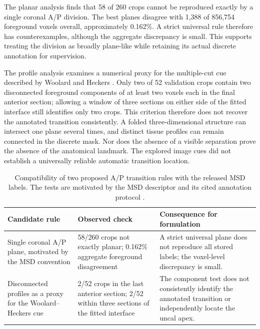 \documentclass[12pt,a4paper]{article}
\begin{document}
The planar analysis finds that 58 of 260 crops cannot be reproduced
exactly by a single coronal A/P division. The best planes disagree
with 1,388 of 856,754 foreground voxels overall, approximately
0.162\%. A strict universal rule therefore has counterexamples,
although the aggregate discrepancy is small. This supports treating
the division as broadly plane-like while retaining its actual discrete
annotation for supervision.

The profile analysis examines a numerical proxy for the multiple-cut
cue described by Woolard and Heckers \cite{woolard2012asymmetry}.
Only two of 52 validation crops contain two disconnected foreground
components of at least two voxels each in the final anterior section;
allowing a window of three sections on either side of the fitted
interface still identifies only two crops. This criterion therefore
does not recover the annotated transition consistently. A folded
three-dimensional structure can intersect one plane several times,
and distinct tissue profiles can remain connected in the discrete mask.
Nor does the absence of a visible separation prove the absence of the
anatomical landmark. The explored image cues did not establish a
universally reliable automatic transition location.

\begin{table}[htbp]
\centering\small{}
\begin{tabular}{@{}P{3.6cm}P{4.2cm}P{6.8cm}@{}}
\hline
Candidate rule & Observed check & Consequence for formulation \\
\hline
Single coronal A/P plane, motivated by the MSD convention & 58/260 crops not exactly planar; 0.162\% aggregate foreground disagreement & A strict universal plane does not reproduce all stored labels; the voxel-level discrepancy is small. \\[.6em]
Disconnected profiles as a proxy for the Woolard--Heckers cue & 2/52 crops in the last anterior section; 2/52 within three sections of the fitted interface & The component test does not consistently identify the annotated transition or independently locate the uncal apex. \\
\hline
\end{tabular}
\caption{Compatibility of two proposed A/P transition rules with the
released MSD labels. The tests are motivated by the MSD descriptor and
its cited annotation protocol \cite{simpson2019dataset,woolard2012asymmetry}.}
\label{tab:annotation-audit-results}
\end{table}
\end{document}
